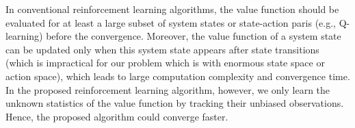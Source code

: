 \begin{remark}
    {
        In conventional reinforcement learning algorithms, the value function should be evaluated for at least a large subset of system states or state-action paris (e.g., Q-learning) before the convergence.
        Moreover, the value function of a system state can be updated only when this system state appears after state transitions (which is impractical for our problem which is with enormous state space or action space), which leads to large computation complexity and convergence time.
        In the proposed reinforcement learning algorithm, however, we only learn the unknown statistics of the value function by tracking their unbiased observations.
        Hence, the proposed algorithm could converge faster.
    }%
\end{remark}
